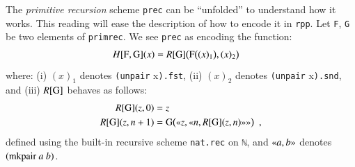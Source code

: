 \documentclass[preprint]{elsarticle}
\theoremstyle{remark}
\begin{document}
The \emph{primitive recursion} scheme \lstinline|prec| can be ``unfolded'' to understand how it works. This reading will ease the description of how to encode it in \lstinline|rpp|.
Let \lstinline|F|, \lstinline|G| be two elements of \lstinline|primrec|. We see \lstinline|prec| as encoding the function:
\begin{align}
\label{align:function H}
H[\mbox{\lstinline|F|},\mbox{\lstinline|G|}](x) & =
R[\mbox{\lstinline|G|}]\big( \mbox{\lstinline|F|} \big((x)_1 \big) , (x)_2 \big)
\end{align}
where:
(i) $(x)_1$ denotes \lstinline|(unpair| x\lstinline|).fst|,
(ii) $(x)_2$ denotes \lstinline|(unpair| x\lstinline|).snd|,
and
(iii) $R [\mbox{\lstinline|G|}] $ behaves as follows:
\begin{equation}
\label{equation:function R}
\begin{aligned}
    R[\mbox{\lstinline|G|}](z,0) & = z \\
    R[\mbox{\lstinline|G|}](z,n+1) &
    = \mbox{\lstinline|G|} \big(
      \gl z, \gl n, R[\mbox{\lstinline|G|}](z,n) \gr \gr
      \big)
   \enspace ,
\end{aligned}
\end{equation}
defined using the built-in recursive scheme \lstinline|nat.rec| on \lstinline|ℕ|, and $ \gl a, b \gr $ denotes $ (\mbox{\lstinline|mkpair|}\ a\ b) $.

\end{document}
